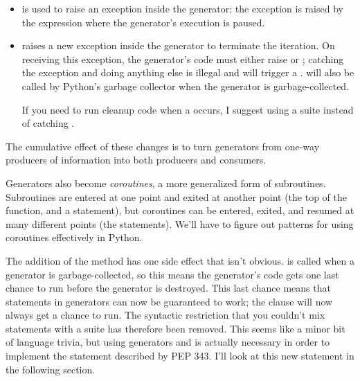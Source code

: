 \documentclass{howto}
\begin{document}
\begin{itemize}

  \item {} is used to raise an exception inside the
  generator; the exception is raised by the  expression
  where the generator's execution is paused.

  \item {} raises a new 
  exception inside the generator to terminate the iteration.  
  On receiving this
  exception, the generator's code must either raise
   or ; catching the 
  exception and doing anything else is illegal and will trigger
  a .   will also be called by 
  Python's garbage collector when the generator is garbage-collected.

  If you need to run cleanup code when a  occurs,
  I suggest using a  suite instead of 
  catching .

\end{itemize}

The cumulative effect of these changes is to turn generators from
one-way producers of information into both producers and consumers.

Generators also become \emph{coroutines}, a more generalized form of
subroutines.  Subroutines are entered at one point and exited at
another point (the top of the function, and a 
statement), but coroutines can be entered, exited, and resumed at
many different points (the  statements).  We'll have to
figure out patterns for using coroutines effectively in Python.

The addition of the  method has one side effect that
isn't obvious.   is called when a generator is
garbage-collected, so this means the generator's code gets one last
chance to run before the generator is destroyed.  This last chance
means that  statements in generators can now be
guaranteed to work; the  clause will now always get a
chance to run.  The syntactic restriction that you couldn't mix
 statements with a  suite has
therefore been removed.  This seems like a minor bit of language
trivia, but using generators and  is actually
necessary in order to implement the   statement
described by PEP 343.  I'll look at this new statement in the following 
section.
\end{document}
